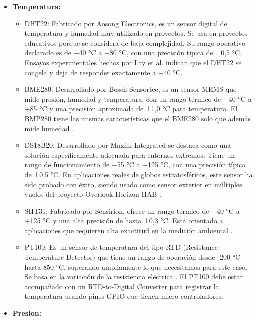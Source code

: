 \documentclass[12pt,a4paper]{article}
\begin{document}
\begin{itemize}
\item
  \textbf{Temperatura:}

  \begin{itemize}
  \item
    DHT22: Fabricado por Aosong Electronics, es un sensor digital de temperatura y humedad muy utilizado en proyectos. Se usa en proyectos educativos porque se considera de baja complejidad. Su rango operativo declarado es de −40 °C a +80 °C, con una precisión típica de ±0,5 °C. Ensayos experimentales hechos por Lay et al. \cite{ref3} indican que el DHT22 se congela y deja de responder exactamente a −40 °C.
  \item
    BME280: Desarrollado por Bosch Sensortec, es un sensor MEMS que mide presión, humedad y temperatura, con un rango térmico de −40 °C a +85 °C y una precisión aproximada de ±1,0 °C para temperatura. El BMP280 tiene las mismas características que el BME280 solo que además mide humedad \cite{ref9}.
  \item
    DS18B20: Desarrollado por Maxim Integrated \cite{ref5} se destaca como una solución específicamente adecuada para entornos extremos. Tiene un rango de funcionamiento de −55 °C a +125 °C, con una precisión típica de ±0,5 °C. En aplicaciones reales de globos estratosféricos, este sensor ha sido probado con éxito, siendo usado como sensor exterior en múltiples vuelos del proyecto Overlook Horizon HAB \cite{ref6}.
  \item
    SHT31: Fabricado por Sensirion, ofrece un rango térmico de −40 °C a +125 °C y una alta precisión de hasta ±0,3 °C. Está orientado a aplicaciones que requieren alta exactitud en la medición ambiental \cite{ref7}.
  \item
    PT100: Es un sensor de temperatura del tipo RTD (Resistance Temperature Detector) que tiene un rango de operación desde -200 °C hasta 850 °C, superando ampliamente lo que necesitamos para este caso. Se basa en la variación de la resistencia eléctrica \cite{ref8}. El PT100 debe estar acompañado con un RTD-to-Digital Converter para registrar la temperatura usando pines GPIO que tienen micro controladores.
  \end{itemize}
\item
  \textbf{Presion:}


\end{itemize}
\end{document}
